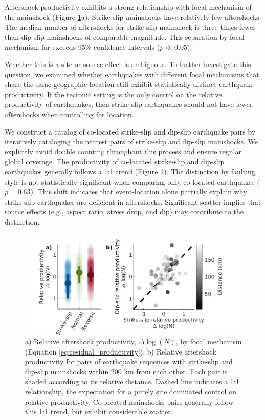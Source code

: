 \documentclass[draft, jgrga]{agujournal2018}
\begin{document}
    Aftershock productivity exhibits a strong relationship with focal mechanism of the mainshock (Figure \ref{fig:coloc}a). Strike-slip mainshocks have relatively few aftershocks. The median number of aftershocks for strike-slip mainshock is three times fewer than dip-slip mainshocks of comparable magnitude. This separation by focal mechanism far exceeds 95\% confidence intervals ($p\ll 0.05$). 
    
    Whether this is a site or source effect is ambiguous. To further investigate this question, we examined whether earthquakes with different focal mechanisms that share the same geographic location still exhibit statistically distinct earthquake productivity. If the tectonic setting is the only control on the relative productivity of earthquakes, then strike-slip earthquakes should not have fewer aftershocks when controlling for location. 
    
    We construct a catalog of co-located strike-slip and dip-slip earthquake pairs by iteratively cataloging the nearest pairs of strike-slip and dip-slip mainshocks. We explicitly avoid double counting throughout this process and ensure regular global coverage. The productivity of co-located strike-slip and dip-slip earthquakes generally follows a 1:1 trend (Figure \ref{fig:coloc}). The distinction by faulting style is not statistically significant when comparing only co-located earthquakes ($p = 0.63$). This shift indicates that event-location alone partially explain why strike-slip earthquakes are deficient in aftershocks. Significant scatter implies that source effects (e.g., aspect ratio, stress drop, and dip) may contribute to the distinction.
    
    \begin{figure}
        \centering
        \includegraphics{figures/fmspairs.png}
        \caption{a) Relative aftershock productivity, $\Delta \log(N)$, by focal mechanism (Equation \ref{eq:residual_productivity}). b) Relative aftershock productivity for pairs of earthquake sequences with strike-slip and dip-slip mainshocks within 200 km from each other. Each pair is shaded according to its relative distance. Dashed line indicates a 1:1 relationship, the expectation for a purely site dominated control on relative productivity. Co-located mainshocks pairs generally follow this 1:1 trend, but exhibit considerable scatter.}
        \label{fig:coloc}
    \end{figure}
        
\end{document}

